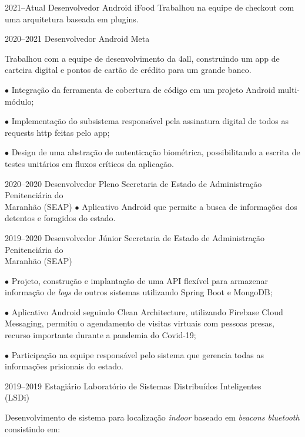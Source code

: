 \documentclass[]{../document-class/twentysecondcv}
\begin{document}
\begin{twenty}
	\twentyitem
		{2021--Atual}
		{Desenvolvedor Android}
		{iFood}
		{
			Trabalhou na equipe de checkout com uma arquitetura baseada em plugins.
		}

	\twentyitem
		{2020--2021}
		{Desenvolvedor Android}
		{Meta}
		{
			Trabalhou com a equipe de desenvolvimento da 4all, construindo um app de carteira digital e pontos de cartão de crédito para um grande banco. \vskip 4pt

			$\bullet$ Integração da ferramenta de cobertura de código em um projeto Android multi-módulo; \vskip 4pt

			$\bullet$ Implementação do subsistema responsável pela assinatura digital de todos as requests http feitas pelo app; \vskip 4pt

			$\bullet$ Design de uma abstração de autenticação biométrica, possibilitando a escrita de testes unitários em fluxos críticos da aplicação.
		}

	\twentyitem
		{2020--2020}
		{Desenvolvedor Pleno}
		{Secretaria de Estado de Administração Penitenciária do \\\hspace*{\fill}Maranhão (SEAP)}
		{
			$\bullet$ Aplicativo Android que permite a busca de informações dos detentos e foragidos do estado.
		}

	\twentyitem
		{2019--2020}
		{Desenvolvedor Júnior}
		{Secretaria de Estado de Administração Penitenciária do \\\hspace*{\fill}Maranhão (SEAP)}
		{
			$\bullet$ Projeto, construção e implantação de uma API flexível para armazenar informação de \textit{logs} de outros sistemas utilizando Spring Boot e MongoDB;\vskip 4pt 

			$\bullet$ Aplicativo Android seguindo Clean Architecture, utilizando Firebase Cloud Messaging, permitiu o agendamento de visitas virtuais com pessoas presas, recurso importante durante a pandemia do Covid-19;\vskip 4pt

			$\bullet$ Participação na equipe responsável pelo sistema que gerencia todas as informações prisionais do estado.
		}
	
	\twentyitem
		{2019--2019}
		{Estagiário}
		{Laboratório de Sistemas Distribuídos Inteligentes \\\hspace*{\fill}(LSDi)}
		{
			Desenvolvimento de sistema para localização \textit{indoor} baseado em \textit{beacons bluetooth} consistindo em:\vskip 4pt
          
}
\end{twenty}
\end{document}
